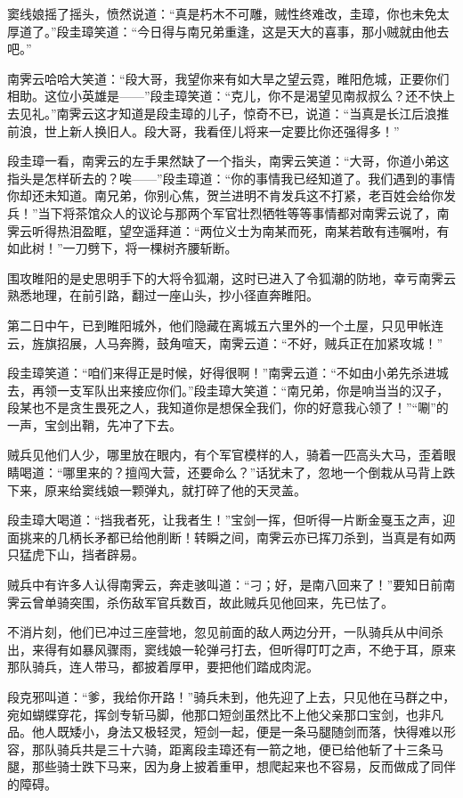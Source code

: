 \documentclass[12pt,oneside]{book}
\begin{document}
窦线娘摇了摇头，愤然说道：``真是朽木不可雕，贼性终难改，圭璋，你也未免太厚道了。''段圭璋笑道：``今日得与南兄弟重逢，这是天大的喜事，那小贼就由他去吧。''

南霁云哈哈大笑道：``段大哥，我望你来有如大旱之望云霓，睢阳危城，正要你们相助。这位小英雄是------''段圭璋笑道：``克儿，你不是渴望见南叔叔么？还不快上去见礼。''南霁云这才知道是段圭璋的儿子，惊奇不已，说道：``当真是长江后浪推前浪，世上新人换旧人。段大哥，我看侄儿将来一定要比你还强得多！''

段圭璋一看，南霁云的左手果然缺了一个指头，南霁云笑道：``大哥，你道小弟这指头是怎样斫去的？唉------''段圭璋道：``你的事情我已经知道了。我们遇到的事情你却还未知道。南兄弟，你别心焦，贺兰进明不肯发兵这不打紧，老百姓会给你发兵！''当下将茶馆众人的议论与那两个军官壮烈牺牲等等事情都对南霁云说了，南霁云听得热泪盈眶，望空遥拜道：``两位义士为南某而死，南某若敢有违嘱咐，有如此树！''一刀劈下，将一棵树齐腰斩断。

围攻睢阳的是史思明手下的大将令狐潮，这时已进入了令狐潮的防地，幸亏南霁云熟悉地理，在前引路，翻过一座山头，抄小径直奔睢阳。

第二日中午，已到睢阳城外，他们隐藏在离城五六里外的一个土屋，只见甲帐连云，旌旗招展，人马奔腾，鼓角喧天，南霁云道：``不好，贼兵正在加紧攻城！''

段圭璋笑道：``咱们来得正是时候，好得很啊！''南霁云道：``不如由小弟先杀进城去，再领一支军队出来接应你们。''段圭璋大笑道：``南兄弟，你是响当当的汉子，段某也不是贪生畏死之人，我知道你是想保全我们，你的好意我心领了！''``唰''的一声，宝剑出鞘，先冲了下去。

贼兵见他们人少，哪里放在眼内，有个军官模样的人，骑着一匹高头大马，歪着眼睛喝道：``哪里来的？擅闯大营，还要命么？''话犹未了，忽地一个倒栽从马背上跌下来，原来给窦线娘一颗弹丸，就打碎了他的天灵盖。

段圭璋大喝道：``挡我者死，让我者生！''宝剑一挥，但听得一片断金戛玉之声，迎面挑来的几柄长矛都已给他削断！转瞬之间，南霁云亦已挥刀杀到，当真是有如两只猛虎下山，挡者辟易。

贼兵中有许多人认得南霁云，奔走骇叫道：``刁；好，是南八回来了！''要知日前南霁云曾单骑突围，杀伤敌军官兵数百，故此贼兵见他回来，先已怯了。

不消片刻，他们已冲过三座营地，忽见前面的敌人两边分开，一队骑兵从中间杀出，来得有如暴风骤雨，窦线娘一轮弹弓打去，但听得叮叮之声，不绝于耳，原来那队骑兵，连人带马，都披着厚甲，要把他们踏成肉泥。

段克邪叫道：``爹，我给你开路！''骑兵未到，他先迎了上去，只见他在马群之中，宛如蝴蝶穿花，挥剑专斩马脚，他那口短剑虽然比不上他父亲那口宝剑，也非凡品。他人既矮小，身法又极轻灵，短剑一起，便是一条马腿随剑而落，快得难以形容，那队骑兵共是三十六骑，距离段圭璋还有一箭之地，便已给他斩了十三条马腿，那些骑士跌下马来，因为身上披着重甲，想爬起来也不容易，反而做成了同伴的障碍。
\end{document}
